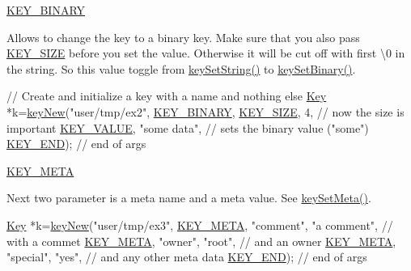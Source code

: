 \begin{DoxyItemize}
\item \hyperlink{group__key_gga91fb3178848bd682000958089abbaf40a1ca18d4e094ae7487d35ecedda2235ff}{K\-E\-Y\-\_\-\-B\-I\-N\-A\-R\-Y} \par
 Allows to change the key to a binary key. Make sure that you also pass \hyperlink{group__key_gga91fb3178848bd682000958089abbaf40a6d531b5c41445d19d0452eebdccbfa01}{K\-E\-Y\-\_\-\-S\-I\-Z\-E} before you set the value. Otherwise it will be cut off with first \textbackslash{}0 in the string. So this value toggle from \hyperlink{group__keyvalue_ga622bde1eb0e0c4994728331326340ef2}{key\-Set\-String()} to \hyperlink{group__keyvalue_gaa50a5358fd328d373a45f395fa1b99e7}{key\-Set\-Binary()}. 
\begin{DoxyCodeInclude}
\textcolor{comment}{// Create and initialize a key with a name and nothing else}
\hyperlink{classkdb_1_1Key_a5679f5cae63caddd64a60388b9cc77fa}{Key} *k=\hyperlink{group__key_gad23c65b44bf48d773759e1f9a4d43b89}{keyNew}(\textcolor{stringliteral}{"user/tmp/ex2"},
        \hyperlink{group__key_gga91fb3178848bd682000958089abbaf40a1ca18d4e094ae7487d35ecedda2235ff}{KEY\_BINARY},
        \hyperlink{group__key_gga91fb3178848bd682000958089abbaf40a6d531b5c41445d19d0452eebdccbfa01}{KEY\_SIZE}, 4,               \textcolor{comment}{// now the size is important}
        \hyperlink{group__key_gga91fb3178848bd682000958089abbaf40ac66e4a49d09212b79f5754ca6db5bd2e}{KEY\_VALUE}, \textcolor{stringliteral}{"some data"},    \textcolor{comment}{// sets the binary value ("some")}
        \hyperlink{group__key_gga91fb3178848bd682000958089abbaf40aa8adb6fcb92dec58fb19410eacfdd403}{KEY\_END});                  \textcolor{comment}{// end of args}
\end{DoxyCodeInclude}

\item \hyperlink{group__key_gga91fb3178848bd682000958089abbaf40a040582834bb2d90049947d7ef74e87e2}{K\-E\-Y\-\_\-\-M\-E\-T\-A} \par
 Next two parameter is a meta name and a meta value. See \hyperlink{group__keymeta_gae1f15546b234ffb6007d8a31178652b9}{key\-Set\-Meta()}. 
\begin{DoxyCodeInclude}
\hyperlink{classkdb_1_1Key_a5679f5cae63caddd64a60388b9cc77fa}{Key} *k=\hyperlink{group__key_gad23c65b44bf48d773759e1f9a4d43b89}{keyNew}(\textcolor{stringliteral}{"user/tmp/ex3"},
        \hyperlink{group__key_gga91fb3178848bd682000958089abbaf40a040582834bb2d90049947d7ef74e87e2}{KEY\_META}, \textcolor{stringliteral}{"comment"}, \textcolor{stringliteral}{"a comment"},  \textcolor{comment}{// with a commet}
        \hyperlink{group__key_gga91fb3178848bd682000958089abbaf40a040582834bb2d90049947d7ef74e87e2}{KEY\_META}, \textcolor{stringliteral}{"owner"}, \textcolor{stringliteral}{"root"},         \textcolor{comment}{// and an owner}
        \hyperlink{group__key_gga91fb3178848bd682000958089abbaf40a040582834bb2d90049947d7ef74e87e2}{KEY\_META}, \textcolor{stringliteral}{"special"}, \textcolor{stringliteral}{"yes"},        \textcolor{comment}{// and any other meta data}
        \hyperlink{group__key_gga91fb3178848bd682000958089abbaf40aa8adb6fcb92dec58fb19410eacfdd403}{KEY\_END});                  \textcolor{comment}{// end of args}
\end{DoxyCodeInclude}


\end{DoxyItemize}
